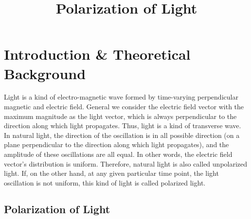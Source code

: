\documentclass{my_template}
\title{Polarization of Light}
\begin{document}
    \maketitle
    \tableofcontents
    \newpage
    \section{Introduction \& Theoretical Background}
    \paragraph{}Light is a kind of electro-magnetic wave formed by time-varying perpendicular magnetic and electric field. General we consider the electric field vector with the maximum magnitude as the light vector, which is always perpendicular to the direction along which light propagates. Thus, light is a kind of transverse wave. In natural light, the direction of the oscillation is in all possible direction (on a plane perpendicular to the direction along which light propagates), and the amplitude of these oscillations are all equal. In other words, the electric field vector's distribution is uniform. Therefore, natural light is also called unpolarized light. If, on the other hand, at any given particular time point, the light oscillation is not uniform, this kind of light is called polarized light. 
    \subsection{Polarization of Light}
\end{document}
